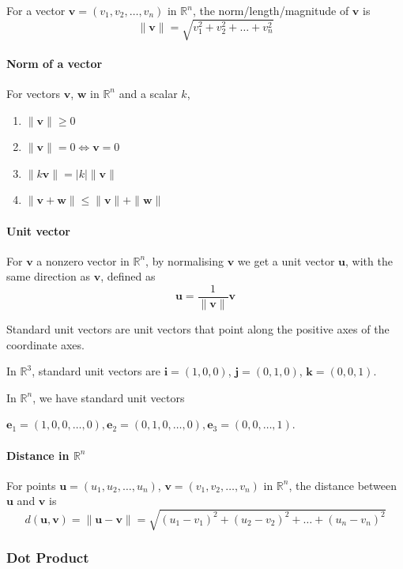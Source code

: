 \documentclass[../linear-algebra.tex]{subfiles}
\begin{document}
\noindent For a vector $\mathbf{v} = (v_1, v_2,\ldots, v_n)$ in $\mathbb{R}^n$,
the norm/length/magnitude of $\mathbf{v}$ is
\[\|\mathbf{v}\| = \sqrt{v_1^2 + v_2^2 + \dots + v_n^2}\]

\paragraph{Norm of a vector}
For vectors $\mathbf{v}$, $\mathbf{w}$ in $\mathbb{R}^n$ and a scalar $k$,
\begin{enumerate}
    \item $\|\mathbf{v}\| \geq 0$
    \item $\|\mathbf{v}\| = 0 \iff \mathbf{v} = 0$
    \item $\|k\mathbf{v}\| = |k|\|\mathbf{v}\|$
    \item $\|\mathbf{v} + \mathbf{w}\| \leq \|\mathbf{v}\| + \|\mathbf{w}\|$
\end{enumerate}

\paragraph{Unit vector}
For $\mathbf{v}$ a nonzero vector in $\mathbb{R}^n$, by normalising $\mathbf{v}$
we get a unit vector $\mathbf{u}$, with the same direction as $\mathbf{v}$,
defined as
\[\mathbf{u} = \frac{1}{\|\mathbf{v}\|}\mathbf{v}\]

\noindent Standard unit vectors are unit vectors that point along the positive axes
of the coordinate axes.

\noindent In $\mathbb{R}^3$, standard unit vectors are $\mathbf{i} = (1, 0, 0)$, $\mathbf{j} = (0, 1, 0)$, $\mathbf{k} = (0, 0, 1)$.

\noindent In $\mathbb{R}^n$, we have standard unit vectors

$\mathbf{e}_1 = (1, 0, 0, \ldots, 0), \mathbf{e}_2 = (0, 1, 0, \ldots, 0), \mathbf{e}_3 = (0, 0, \ldots, 1)$.

\paragraph{Distance in $\mathbb{R}^n$}
For points $\mathbf{u} = (u_1, u_2, \ldots, u_n)$, $\mathbf{v} = (v_1, v_2, \ldots, v_n)$ in $\mathbb{R}^n$,
the distance between $\mathbf{u}$ and $\mathbf{v}$ is
\[d(\mathbf{u}, \mathbf{v}) = \|\mathbf{u} - \mathbf{v}\|
= \sqrt{(u_1 - v_1)^2 + (u_2 - v_2)^2 + \ldots + (u_n - v_n)^2}\]

\subsubsection*{Dot Product}
\end{document}
